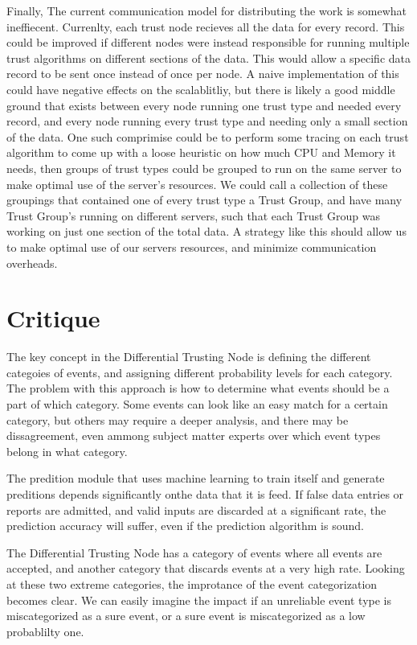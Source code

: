 \documentclass[11pt]{article}
\begin{document}
Finally, The current communication model for distributing the work is somewhat ineffiecent. Currenlty, each trust node recieves all the data for every record. This could be improved if different nodes were instead responsible for running multiple trust algorithms on different sections of the data. This would allow a specific data record to be sent once instead of once per node. A naive implementation of this could have negative effects on the scalablitliy, but there is likely a good middle ground that exists between every node running one trust type and needed every record, and every node running every trust type and needing only a small section of the data. One such comprimise could be to perform some tracing on each trust algorithm to come up with a loose heuristic on how much CPU and Memory it needs, then groups of trust types could be grouped to run on the same server to make optimal use of the server's resources. We could call a collection of these groupings that contained one of every trust type a Trust Group, and have many Trust Group's running on different servers, such that each Trust Group was working on just one section of the total data. A strategy like this should allow us to make optimal use of our servers resources, and minimize communication overheads.

\cleardoublepage

\section*{Critique}

The key concept in the Differential Trusting Node is defining the different categoies of events, and assigning different probability levels for each category. The problem with this approach is how to determine what events should be a part of which category. Some events can look like an easy match for a certain category, but others may require a deeper analysis, and there may be dissagreement, even ammong subject matter experts over which event types belong in what category.

The predition module that uses machine learning to train itself and generate preditions depends significantly onthe data that it is feed. If false data entries or reports are admitted, and valid inputs are discarded at a significant rate, the prediction accuracy will suffer, even if the prediction algorithm is sound.

The Differential Trusting Node has a category of events where all events are accepted, and another category that discards events at a very high rate. Looking at these two extreme categories, the improtance of the event categorization becomes clear. We can easily imagine the impact if an unreliable event type is miscategorized as a sure event, or a sure event is miscategorized as a low probablilty one.
\end{document}

